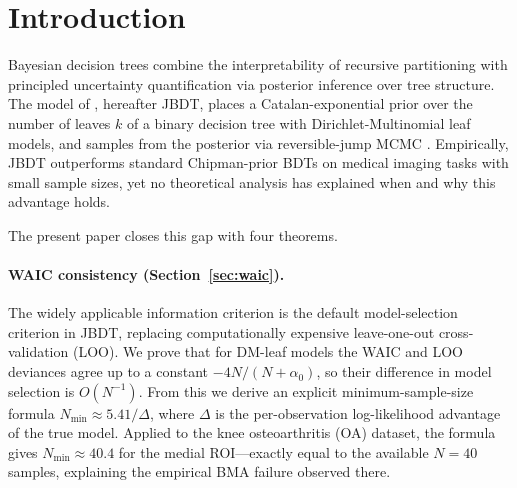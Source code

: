 \documentclass[ba]{imsart}
\theoremstyle{plain}
\theoremstyle{definition}
\theoremstyle{remark}
\newcommand{\Nmin}{N_{\min}}
\begin{document}
\begin{frontmatter}
\begin{keyword}[class=MSC]
\end{keyword}

\begin{keyword}
\end{keyword}

\tableofcontents

\end{frontmatter}

\section{Introduction}
\label{sec:intro}

Bayesian decision trees combine the interpretability of recursive partitioning
with principled uncertainty quantification via posterior inference over tree
structure. The model of \citet{schetinin2025}, hereafter JBDT, places a
Catalan-exponential prior over the number of leaves $k$ of a binary decision
tree with Dirichlet-Multinomial leaf models, and samples from the posterior via
reversible-jump MCMC \citep{green1995}.
Empirically, JBDT outperforms standard Chipman-prior BDTs
\citep{chipman1998} on medical imaging tasks with small sample sizes, yet no
theoretical analysis has explained when and why this advantage holds.

The present paper closes this gap with four theorems.

\paragraph{WAIC consistency (Section~\ref{sec:waic}).}
The widely applicable information criterion \citep{watanabe2010,watanabe2013}
is the default model-selection criterion in JBDT, replacing computationally
expensive leave-one-out cross-validation (LOO).
We prove that for DM-leaf models the WAIC and LOO deviances agree up to a
constant $-4N/(N+\alpha_0)$, so their difference in model selection is
$O(N^{-1})$.
From this we derive an explicit minimum-sample-size formula
$\Nmin \approx 5.41/\Delta$, where $\Delta$ is the per-observation log-likelihood
advantage of the true model.
Applied to the \citet{jakaite2021} knee osteoarthritis (OA) dataset,
the formula gives $\Nmin \approx 40.4$ for the medial ROI---exactly equal to
the available $N=40$ samples, explaining the empirical BMA failure observed there.
\end{document}
